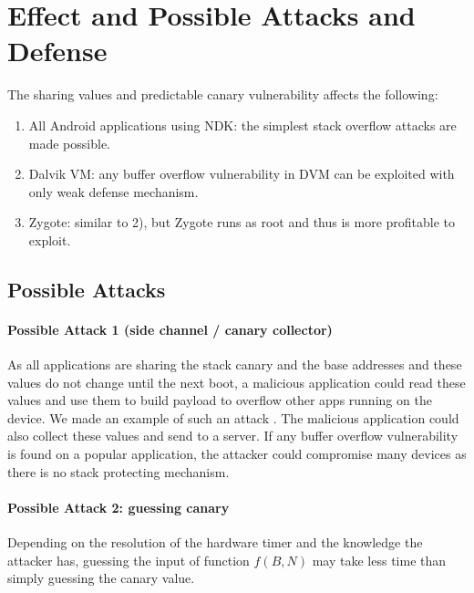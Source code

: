 \section{Effect and Possible Attacks and Defense}

The sharing values and predictable canary vulnerability affects the following:
\begin{enumerate}

\item All Android applications using NDK: the simplest stack overflow attacks are made possible.

\item Dalvik VM: any buffer overflow vulnerability in DVM can be exploited with only weak defense mechanism.

\item Zygote: similar to 2), but Zygote runs as root and thus is more profitable to exploit.

\end{enumerate}

\subsection{Possible Attacks}

\paragraph*{Possible Attack 1 (side channel / canary collector)} 

As all applications are sharing the stack canary and the base addresses and these values do not change until the next boot, a malicious application could read these values and use them to build payload to overflow other apps running on the device. We made an example of such an attack \cite{jnioverflow}. The malicious application could also collect these values and send to a server. If any buffer overflow vulnerability is found on a popular application, the attacker could compromise many devices as there is no stack protecting mechanism.

\paragraph*{Possible Attack 2: guessing canary} 

Depending on the resolution of the hardware timer and the knowledge the attacker has,  guessing the input of function $f(B, N)$ may take less time than simply guessing the canary value.

